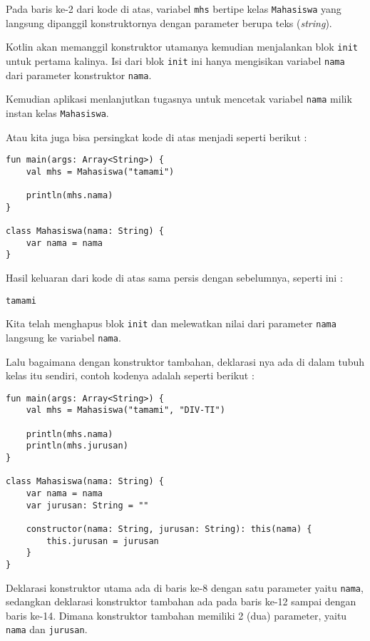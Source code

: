 Pada baris ke-2 dari kode di atas, variabel \texttt{mhs} bertipe kelas \texttt{Mahasiswa} yang langsung dipanggil konstruktornya dengan parameter berupa teks (\textit{string}). 

Kotlin akan memanggil konstruktor utamanya kemudian menjalankan blok \texttt{init} untuk pertama kalinya. Isi dari blok \texttt{init} ini hanya mengisikan variabel \texttt{nama} dari parameter konstruktor \texttt{nama}.

Kemudian aplikasi menlanjutkan tugasnya untuk mencetak variabel \texttt{nama} milik instan kelas \texttt{Mahasiswa}.

Atau kita juga bisa persingkat kode di atas menjadi seperti berikut :

\begin{lstlisting}
fun main(args: Array<String>) {
	val mhs = Mahasiswa("tamami")
	
	println(mhs.nama)
}

class Mahasiswa(nama: String) {
	var nama = nama
}
\end{lstlisting}

Hasil keluaran dari kode di atas sama persis dengan sebelumnya, seperti ini :

\begin{lstlisting}
tamami
\end{lstlisting}

Kita telah menghapus blok \texttt{init} dan melewatkan nilai dari parameter \texttt{nama} langsung ke variabel \texttt{nama}.

Lalu bagaimana dengan konstruktor tambahan, deklarasi nya ada di dalam tubuh kelas itu sendiri, contoh kodenya adalah seperti berikut :

\begin{lstlisting}
fun main(args: Array<String>) {
	val mhs = Mahasiswa("tamami", "DIV-TI")
	
	println(mhs.nama)
	println(mhs.jurusan)
}

class Mahasiswa(nama: String) {
	var nama = nama
	var jurusan: String = ""
	
	constructor(nama: String, jurusan: String): this(nama) {
		this.jurusan = jurusan
	}
}
\end{lstlisting}

Deklarasi konstruktor utama ada di baris ke-8 dengan satu parameter yaitu \texttt{nama}, sedangkan deklarasi konstruktor tambahan ada pada baris ke-12 sampai dengan baris ke-14. Dimana konstruktor tambahan memiliki 2 (dua) parameter, yaitu \texttt{nama} dan \texttt{jurusan}. 

